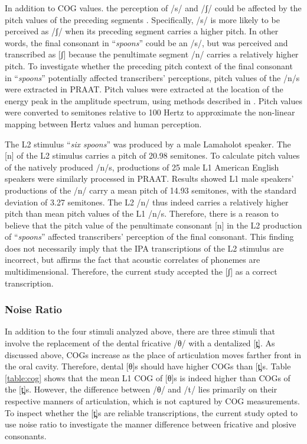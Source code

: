 In addition to COG values. the perception of /s/ and /ʃ/ could be affected by the pitch values of the preceding segments \citep{Niebuhr_2017}. Specifically, /s/ is more likely to be perceived as /ʃ/ when its preceding segment carries a higher pitch. In other words, the final consonant in “\textit{spoons}” could be an /s/, but was perceived and transcribed as [ʃ] because the penultimate segment /n/ carries a relatively higher pitch. To investigate whether the preceding pitch context of the final consonant in “\textit{spoons}” potentially affected transcribers’ perceptions, pitch values of the /n/s were extracted in PRAAT. Pitch values were extracted at the location of the energy peak in the amplitude spectrum, using methods described in \citet{De_Jong_2009}. Pitch values were converted to semitones relative to 100 Hertz to approximate the non-linear mapping between Hertz values and human perception. 

The L2 stimulus “\textit{six spoons}” was produced by a male Lamaholot speaker. The [n] of the L2 stimulus carries a pitch of 20.98 semitones. To calculate pitch values of the natively produced /n/s, productions of 25 male L1 American English speakers were similarly processed in PRAAT. Results showed L1 male speakers’ productions of the /n/ carry a mean pitch of 14.93 semitones, with the standard deviation of 3.27 semitones. The L2 /n/ thus indeed carries a relatively higher pitch than mean pitch values of the L1 /n/s. Therefore, there is a reason to believe that the pitch value of the penultimate consonant [n] in the L2 production of “\textit{spoons}” affected transcribers’ perception of the final consonant. This finding does not necessarily imply that the IPA transcriptions of the L2 stimulus are incorrect, but affirms the fact that acoustic correlates of phonemes are multidimensional. Therefore, the current study accepted the [ʃ] as a correct transcription.

\subsubsection{Noise Ratio}

In addition to the four stimuli analyzed above, there are three stimuli that involve the replacement of the dental fricative /θ/ with a dentalized [t̪]. As discussed above, COGs increase as the place of articulation moves farther front in the oral cavity. Therefore, dental [θ]s should have higher COGs than [t̪]s. Table \ref{table:cog} shows that the mean L1 COG of [θ]s is indeed higher than COGs of the [t̪]s. However, the difference between /θ/ and /t/ lies primarily on their respective manners of articulation, which is not captured by COG measurements. To inspect whether the [t̪]s are reliable transcriptions, the current study opted to use noise ratio to investigate the manner difference between fricative and plosive consonants.

